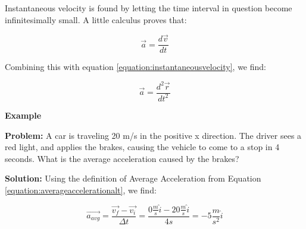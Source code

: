 Instantaneous velocity is found by letting the time interval in question become infinitesimally small.  A little calculus proves that:
\begin{mdframed}[backgroundcolor=orange!20!white]
	\begin{equation}
	\vec{a} = \frac{d \vec{v}}{dt} 
	\end{equation}
\end{mdframed}

Combining this with equation \ref{equation:instantaneousvelocity}, we find:
\begin{mdframed}[backgroundcolor=orange!20!white]
	\begin{equation}
	\vec{a} = \frac{d^2 \vec{r}}{dt^2} 
	\end{equation}
\end{mdframed}


\begin{mdframed}[backgroundcolor=blue!10!white]
	\begin{center}
		
		
		\textbf{Example \thesection}	
	\end{center}
	\vspace{0.1in}
	
	\textbf{Problem: } A car is traveling 20 m/s in the positive x direction.  The driver sees a red light, and applies the brakes, causing the vehicle to come to a stop in 4 seconds.  What is the average acceleration caused by the brakes?
	
	\vspace{0.1in}
	
	\textbf{Solution:} Using the definition of Average Acceleration from Equation \ref{equation:averageaccelerationalt}, we find:
	
	\begin{equation*}
			\overrightarrow{a_{avg}} = \frac{\overrightarrow{v_f} - \overrightarrow {v_i}}{\Delta t} = \frac{0 \frac{m}{s} \hat{i} - 20 \frac{m}{s} \hat{i}}{4 s}   = -5 \frac{m}{s^2} \hat{i}
	\end{equation*}
\end{mdframed}

